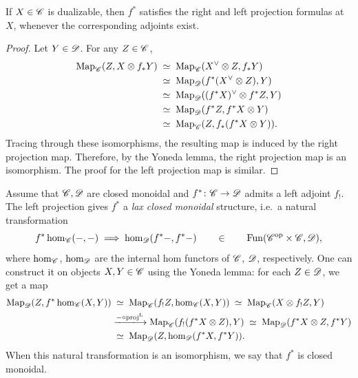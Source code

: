\documentclass[english,svgnames,table]{article}
\begin{document}
    \begin{lemma}
    \label{lem:projection-for-dbl}
        If $X \in \mathscr{C}$ is dualizable, then $f^*$ satisfies the right and left projection formulas at $X$, whenever the corresponding adjoints exist.
    \end{lemma}
    \begin{proof}
        Let $Y \in \mathscr{D}$. For any $Z \in \mathscr{C}$,
        \begin{equation*}
            \begin{split}
                \operatorname{Map}_{\mathscr{C}}(Z, X \otimes f_* Y) 
                & \;\simeq\; \operatorname{Map}_{\mathscr{C}}(X^{\vee} \otimes Z, f_* Y) \\
                & \;\simeq\; \operatorname{Map}_{\mathscr{D}} (f^*(X^{\vee} \otimes Z), Y) \\
                & \;\simeq\; \operatorname{Map}_{\mathscr{D}}((f^* X)^{\vee} \otimes f^* Z, Y) \\
                & \;\simeq\; \operatorname{Map}_{\mathscr{D}}(f^* Z, f^* X \otimes Y) \\
                & \;\simeq\; \operatorname{Map}_{\mathscr{C}}(Z, f_*(f^* X \otimes Y)).
            \end{split}
        \end{equation*}
        Tracing through these isomorphisms, the resulting map is induced by the right projection map. Therefore, by the Yoneda lemma, the right projection map is an isomorphism. The proof for the left projection map is similar.
    \end{proof}

    \begin{remark}
    \label{rmrk:left-projection-to-lax-closed}
        Assume that $\mathscr{C},\mathscr{D}$ are closed monoidal and $f^* \colon \mathscr{C} \to \mathscr{D}$ admits a left adjoint $f_!$. The left projection gives $f^*$ a \emph{lax closed monoidal} structure, i.e.\ a natural transformation
        \begin{equation*}
            f^* \hom_{\mathscr{C}}(-, -) \;\Longrightarrow\; \hom_{\mathscr{D}}(f^* -, f^* -) \qquad \in \qquad \operatorname{Fun}(\mathscr{C}^{\mathrm{op}} \times \mathscr{C}, \mathscr{D}),
        \end{equation*}
        where $\hom_{\mathscr{C}}$, $\hom_{\mathscr{D}}$ are the internal hom functors of $\mathscr{C}$, $\mathscr{D}$, respectively.
        One can construct it on objects $X,Y \in \mathscr{C}$ using the Yoneda lemma: for each $Z \in \mathscr{D}$, we get a map
        \begin{equation*}
            \begin{split}
                \Map_{\cD}(Z, f^* \hom_{\cC}(X,Y)) 
                & \;\simeq\; \Map_{\cC}(f_! Z, \hom_{\cC}(X, Y)) 
                \;\simeq\; \Map_{\cC}(X \otimes f_! Z, Y) \\
                & \xtoo{- \circ \Lproj} \Map_{\cC}(f_!(f^* X \otimes Z), Y)
                \;\simeq\; \Map_{\cD}(f^*X \otimes Z, f^* Y) \\
                & \;\simeq\; \Map_{\cD}(Z, \hom_{\cD}(f^* X, f^* Y)).
            \end{split}
        \end{equation*}
        When this natural transformation is an isomorphism, we say that $f^*$ is closed monoidal.
    \end{remark}
\end{document}
